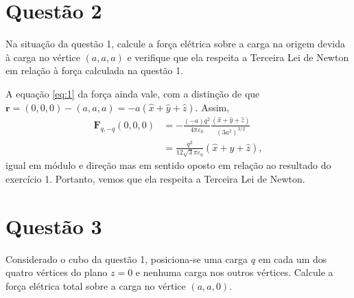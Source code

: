 \documentclass[11pt]{article}
\begin{document}
\section{Questão 2}
\label{sec:orgc4c9bd3}
Na situação da questão 1, calcule a força elétrica sobre a carga na
origem devida à carga no vértice  \((a,a,a)\) e verifique que ela respeita
a Terceira Lei de Newton em relação à força calculada na questão 1.

A equação \ref{eq:1} da força ainda vale, com a distinção de que \(\mathbf
r = (0,0,0) - (a,a,a) = -a(\hat x+\hat y+\hat z)\). Assim,
\begin{align*}
  \mathbf{F}_{q,-q}(0,0,0) &= -\frac{(-a)q^2}{4\pi\varepsilon_0}
                             \frac{(\hat x+\hat y+\hat z)}{(3a^2)^{3/2}}\\
                           &= \frac{q^2}{12\sqrt 3\pi\varepsilon_0}(\hat x+\hat y+\hat z),
\end{align*}
igual em módulo e direção mas em sentido oposto em relação ao resultado
do exercício 1. Portanto, vemos que ela respeita a Terceira Lei de Newton.
\section{Questão 3}
\label{sec:org1927794}
Considerado o cubo da questão 1, posiciona-se uma carga \(q\) em cada um
dos quatro vértices do plano \(z=0\) e nenhuma carga nos outros
vértices. Calcule a força elétrica total sobre a carga no vértice
\((a,a,0)\).
\end{document}
